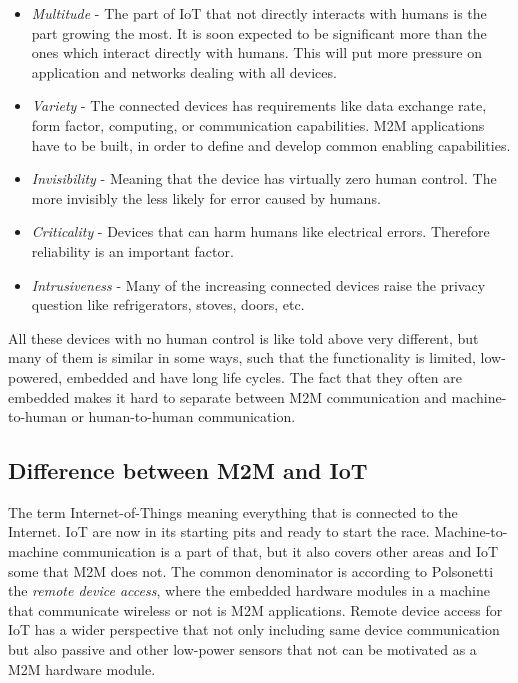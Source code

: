 \begin{itemize}
	\item \textit{Multitude} - The part of IoT that not directly interacts with humans is the part growing the most. It is soon expected to be significant more than the ones which interact directly with humans. This will put more pressure on application and networks dealing with all devices.
	\item \textit{Variety} - The connected devices has requirements like data exchange rate, form factor, computing, or communication capabilities. M2M applications have to be built, in order to define and develop common enabling capabilities.
	\item \textit{Invisibility} -  Meaning that the device has virtually zero human control. The more invisibly the less likely for error caused by humans. 
	\item \textit{Criticality} - Devices that can harm humans like electrical errors. Therefore reliability is an important factor. 
	\item \textit{Intrusiveness} - Many of the increasing connected devices raise the privacy question like refrigerators, stoves, doors, etc.
\end{itemize}
All these devices with no human control is like told above very different, but many of them is similar in some ways, such that the functionality is limited, low-powered, embedded and have long life cycles. The fact that they often are embedded makes it hard to separate between M2M communication and machine-to-human or human-to-human communication.
\cite[p.~2-4]{m2mComm}

\subsection{Difference between M2M and IoT}
The term Internet-of-Things meaning everything that is connected to the Internet. IoT are now in its starting pits and ready to start the race. Machine-to-machine communication is a part of that, but it also covers other areas and IoT some that M2M does not. 
The common denominator is according to Polsonetti the \textit{remote device access}, where the embedded hardware modules in a machine that communicate wireless or not is M2M applications. Remote device access for IoT has a wider perspective that not only including same device communication but also passive and other low-power sensors that not can be motivated as a M2M hardware module.
\cite[]{cpM2MIoT}


